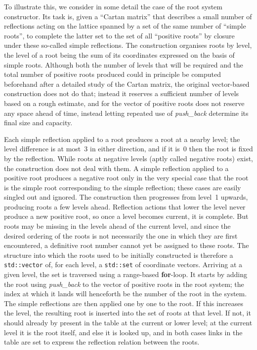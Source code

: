 \documentclass[12pt]{article}
\theoremstyle{plain}
\theoremstyle{definition}
\newcommand\std[1]{\texttt{std::#1}}
\def\vect.{\std{vector}}
\begin{document}
To illustrate this, we consider in some detail the case of the root system
constructor. Its task is, given a ``Cartan matrix'' that describes a small
number of reflections acting on the lattice spanned by a set of the same number
of ``simple roots'', to complete the latter set to the set of all ``positive
roots'' by closure under these so-called simple reflections. The construction
organises roots by level, the level of a root being the sum of its coordinates
expressed on the basis of simple roots. Although both the number of levels that
will be required and the total number of positive roots produced could in
principle be computed beforehand after a detailed study of the Cartan matrix,
the original vector-based construction does not do that; instead it reserves a
sufficient number of levels based on a rough estimate, and for the vector of
positive roots does not reserve any space ahead of time, instead letting
repeated use of \textit{push\_\!back} determine its final size and capacity.

Each simple reflection applied to a root produces a root at a nearby level; the
level difference is at most~$3$ in either direction, and if it is~$0$ then the
root is fixed by the reflection. While roots at negative levels (aptly called
negative roots) exist, the construction does not deal with them. A simple
reflection applied to a positive root produces a negative root only in the very
special case that the root is the simple root corresponding to the simple
reflection; these cases are easily singled out and ignored. The construction
then progresses from level~1 upwards, producing roots a few levels ahead.
Reflection actions that lower the level never produce a new positive root, so
once a level becomes current, it is complete. But roots may be missing in the
levels ahead of the current level, and since the desired ordering of the roots
is not necessarily the one in which they are first encountered, a definitive
root number cannot yet be assigned to these roots. The structure into which the
roots used to be initially constructed is therefore a \vect. of, for each level,
a \std{set} of coordinate vectors. Arriving at a given level, the set is
traversed using a range-based \textbf{for}-loop. It starts by adding the root
using \textit{push\_\!back} to the vector of positive roots in the root system;
the index at which it lands will henceforth be the number of the root in the
system. The simple reflections are then applied one by one to the root. If this
increases the level, the resulting root is inserted into the set of roots at
that level. If not, it should already by present in the table at the current or
lower level; at the current level it is the root itself, and else it is looked
up, and in both cases links in the table are set to express the reflection
relation between the roots.
\end{document}
